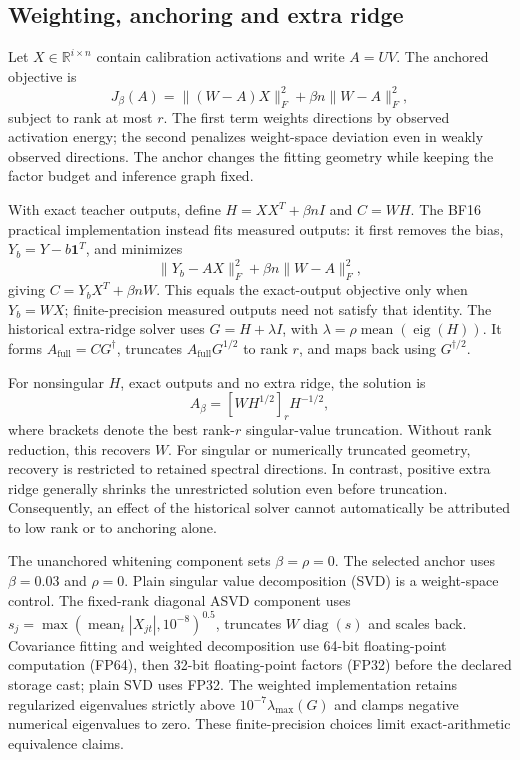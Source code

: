 \documentclass[conference]{IEEEtran}
\begin{document}
\subsection{Weighting, anchoring and extra ridge}
Let $X\in\mathbb{R}^{i\times n}$ contain calibration activations and write $A=UV$. The anchored objective is
\begin{equation}J_\beta(A)=\|(W-A)X\|_F^2+\beta n\|W-A\|_F^2,\end{equation}
subject to rank at most $r$. The first term weights directions by observed activation energy; the second penalizes weight-space deviation even in weakly observed directions. The anchor changes the fitting geometry while keeping the factor budget and inference graph fixed.\par\smallskip
With exact teacher outputs, define $H=XX^T+\beta nI$ and $C=WH$. The BF16 practical implementation instead fits measured outputs: it first removes the bias, $Y_b=Y-b\mathbf{1}^T$, and minimizes
\begin{equation}\|Y_b-AX\|_F^2+\beta n\|W-A\|_F^2,\end{equation}
giving $C=Y_bX^T+\beta nW$. This equals the exact-output objective only when $Y_b=WX$; finite-precision measured outputs need not satisfy that identity. The historical extra-ridge solver uses $G=H+\lambda I$, with $\lambda=\rho\operatorname{mean}(\operatorname{eig}(H))$. It forms $A_{\mathrm{full}}=CG^\dagger$, truncates $A_{\mathrm{full}}G^{1/2}$ to rank $r$, and maps back using $G^{\dagger/2}$.\par\smallskip
For nonsingular $H$, exact outputs and no extra ridge, the solution is
\begin{equation}A_\beta=[WH^{1/2}]_rH^{-1/2},\end{equation}
where brackets denote the best rank-$r$ singular-value truncation. Without rank reduction, this recovers $W$. For singular or numerically truncated geometry, recovery is restricted to retained spectral directions. In contrast, positive extra ridge generally shrinks the unrestricted solution even before truncation. Consequently, an effect of the historical solver cannot automatically be attributed to low rank or to anchoring alone.\par\smallskip
The unanchored whitening component sets $\beta=\rho=0$. The selected anchor uses $\beta=0.03$ and $\rho=0$. Plain singular value decomposition (SVD) is a weight-space control. The fixed-rank diagonal ASVD component uses $s_j=\max(\operatorname{mean}_t|X_{jt}|,10^{-8})^{0.5}$, truncates $W\operatorname{diag}(s)$ and scales back. Covariance fitting and weighted decomposition use 64-bit floating-point computation (FP64), then 32-bit floating-point factors (FP32) before the declared storage cast; plain SVD uses FP32. The weighted implementation retains regularized eigenvalues strictly above $10^{-7}\lambda_{\max}(G)$ and clamps negative numerical eigenvalues to zero. These finite-precision choices limit exact-arithmetic equivalence claims.\par\smallskip
\end{document}

